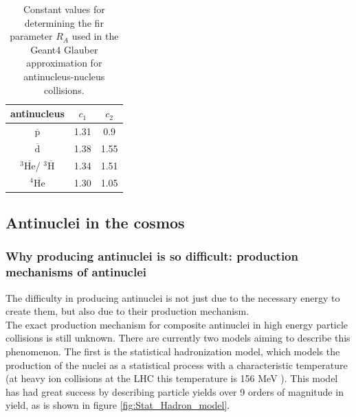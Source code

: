 \begin{table}[]
    \centering
    \begin{tabular}{|c|c|c|}
        \hline
        antinucleus & $c_1$ & $c_2$ \\
        \hline 
        $\overline{\mathrm{p}}$& 1.31& 0.9\\
        \hline
        $\overline{\mathrm{d}}$& 1.38& 1.55\\
        \hline
        $^3\overline{\mathrm{He}}$/ $^3\overline{\mathrm{H}}$& 1.34& 1.51\\
        \hline
        $^4\overline{\mathrm{He}}$& 1.30& 1.05\\
        \hline
    \end{tabular}
    \caption{Constant values for determining the fir parameter $R_A$ used in the Geant4 Glauber approximation for antinucleus-nucleus collisions. \cite{Antinucleus-nucleus_Geant4}}
    \label{tab:antinucleus_nucleus_constants_Glauber}
\end{table}






%
%
\subsection{Antinuclei in the cosmos}

\subsubsection{ Why producing antinuclei is so difficult: production mechanisms of antinuclei}\label{sec:IntroProductionAntinuclei}
The difficulty in producing antinuclei is not just due to the necessary energy to create them, but also due to their production mechanism. \\

The exact production mechanism for composite antinuclei in high energy particle collisions is still unknown. There are currently two models aiming to describe this phenomenon. The first is the statistical hadronization model, which models the production of the nuclei as a statistical process with a characteristic temperature (at heavy ion collisions at the LHC this temperature is 156 MeV \cite{4He_PbPb}). This model has had great success by describing particle yields over 9 orders of magnitude in yield, as is shown in figure \ref{fig:Stat_Hadron_model}.

